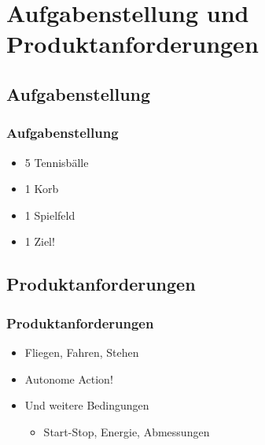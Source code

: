 \section{Aufgabenstellung und Produktanforderungen} %
\subsection{Aufgabenstellung}
\begin{frame}
    \frametitle{Aufgabenstellung}
    \begin{itemize}
    	\item 5 Tennisbälle
    	\item 1 Korb
	    \item 1 Spielfeld
	    \item 1 Ziel!
    \end{itemize}
\end{frame}
\subsection{Produktanforderungen}
\begin{frame}
    \frametitle{Produktanforderungen}
     \begin{itemize}
     	\item Fliegen, Fahren, Stehen
     	\item Autonome Action!
     	\item Und weitere Bedingungen
     	\begin{itemize}
     		\item Start-Stop, Energie, Abmessungen
     	\end{itemize}
     \end{itemize}
\end{frame}
